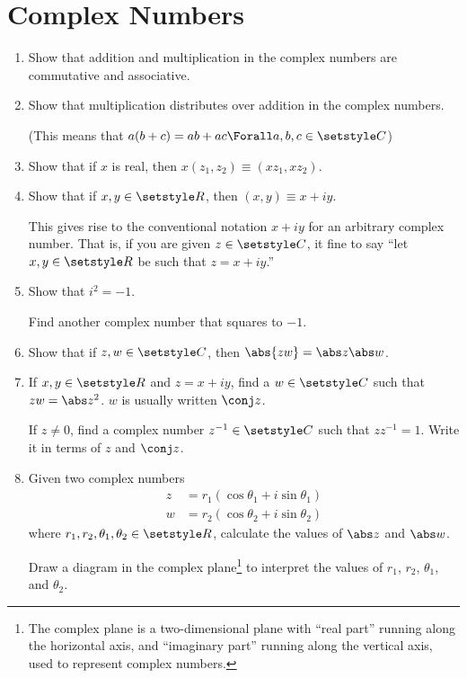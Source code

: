 \section{Complex Numbers}

\begin{enumerate}
 \item
  Show that addition and multiplication in the complex numbers are commutative
  and associative.
 \item
  Show that multiplication distributes over addition in the complex numbers.

  (This means that \(a(b + c) = ab + ac \Forall a, b, c \in \Complex\))
 \item
  Show that if \(x\) is real, then \(x(z_1, z_2) \equiv (x z_1, x z_2)\).
 \item
  Show that if \(x, y \in \Reals\), then \((x, y) \equiv x + i y\).

  This gives rise to the conventional notation \(x + iy\) for an arbitrary
  complex number. That is, if you are given \(z \in \Complex\), it fine to say
  ``let \(x, y \in \Reals\) be such that \(z = x + iy\).''
 \item
  Show that \(i^2 = -1\).

  Find another complex number that squares to \(-1\).
 \item
  Show that if \(z, w \in \Complex\), then \(\abs{zw} = \abs z \abs w\).
 \item
  If \(x, y \in \Reals\) and \(z = x + iy\), find a \(w \in \Complex\) such that
  \(zw = \abs z^2\). \(w\) is usually written \(\conj z\).

  If \(z \ne 0\), find a complex number \(z^{-1} \in \Complex\) such that
  \(zz^{-1} = 1\). Write it in terms of \(z\) and \(\conj z\).
 \item \label{q_compl_args}
  Given two complex numbers
  \begin{align*}
   z &= r_1(\cos \theta_1 + i \sin \theta_1) \\
   w &= r_2(\cos \theta_2 + i \sin \theta_2)
  \end{align*}
  where \(r_1, r_2, \theta_1, \theta_2 \in \Reals\),
  calculate the values of \(\abs z\) and \(\abs w\).

  Draw a diagram in the complex plane\footnote{
   The complex plane is a two-dimensional plane with ``real part'' running along
   the horizontal axis, and ``imaginary part'' running along the vertical axis,
   used to represent complex numbers.
  } to interpret the values of \(r_1\), \(r_2\), \(\theta_1\), and \(\theta_2\).


\end{enumerate}
